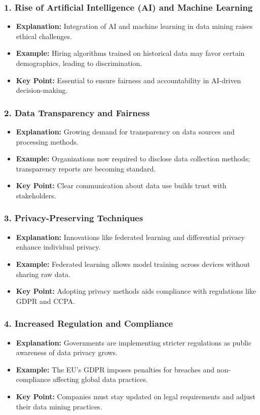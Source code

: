 \documentclass{beamer}
\begin{document}
\begin{frame}[fragile]
    \frametitle{1. Rise of Artificial Intelligence (AI) and Machine Learning}
    \begin{itemize}
        \item \textbf{Explanation:} Integration of AI and machine learning in data mining raises ethical challenges.
        \item \textbf{Example:} Hiring algorithms trained on historical data may favor certain demographics, leading to discrimination.
        \item \textbf{Key Point:} Essential to ensure fairness and accountability in AI-driven decision-making.
    \end{itemize}
\end{frame}

\begin{frame}[fragile]
    \frametitle{2. Data Transparency and Fairness}
    \begin{itemize}
        \item \textbf{Explanation:} Growing demand for transparency on data sources and processing methods.
        \item \textbf{Example:} Organizations now required to disclose data collection methods; transparency reports are becoming standard.
        \item \textbf{Key Point:} Clear communication about data use builds trust with stakeholders.
    \end{itemize}
\end{frame}

\begin{frame}[fragile]
    \frametitle{3. Privacy-Preserving Techniques}
    \begin{itemize}
        \item \textbf{Explanation:} Innovations like federated learning and differential privacy enhance individual privacy.
        \item \textbf{Example:} Federated learning allows model training across devices without sharing raw data.
        \item \textbf{Key Point:} Adopting privacy methods aids compliance with regulations like GDPR and CCPA.
    \end{itemize}
\end{frame}

\begin{frame}[fragile]
    \frametitle{4. Increased Regulation and Compliance}
    \begin{itemize}
        \item \textbf{Explanation:} Governments are implementing stricter regulations as public awareness of data privacy grows.
        \item \textbf{Example:} The EU's GDPR imposes penalties for breaches and non-compliance affecting global data practices.
        \item \textbf{Key Point:} Companies must stay updated on legal requirements and adjust their data mining practices.
    \end{itemize}
\end{frame}
\end{document}
